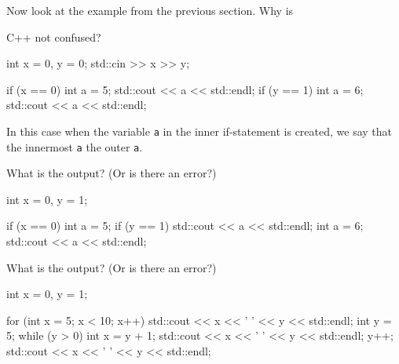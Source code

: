 \begin{ex} Now look at the example from the previous section.
Why is

C++ not confused?

\begin{console}
int x = 0, y = 0;
std::cin >> x >> y;

if (x == 0)
{    
     int a = 5;
     std::cout << a << std::endl;
     if (y == 1)
     {    
          int a = 6;
          std::cout << a << std::endl;
     }
}
\end{console}
\end{ex}
In this case when the variable \texttt{a} in the inner if-statement is created, we say that the innermost \texttt{a}  the outer \texttt{a}.

\begin{ex}What is the output? (Or is there an error?)

\begin{console}
int x = 0, y = 1;

if (x == 0)
{    
     int a = 5;
     if (y == 1)
     {    
          std::cout << a << std::endl;
          int a = 6;
          std::cout << a << std::endl;
     }
}
\end{console}
\end{ex}

\begin{ex} What is the output? (Or is there an error?)

\begin{console}
int x = 0, y = 1;

for (int x = 5; x < 10; x++)
{    
     std::cout << x << ' ' << y << std::endl;
     int y = 5;
     while (y > 0)
     {   
          int x = y + 1;
          std::cout << x << ' ' << y << std::endl;
          y++;
     }  
     std::cout << x << ' ' << y << std::endl;
}
\end{console}
\end{ex}

